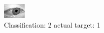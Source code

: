 \begin{figure}[h!]
\begin{center}
\includegraphics[width=0.60\columnwidth]{figures/ID2758_class_2_target_1.png}
\end{center}
\caption{ Classification: 2 actual target: 1}
\label{fig:ID2758_class_2_target_1}
\end{figure}
